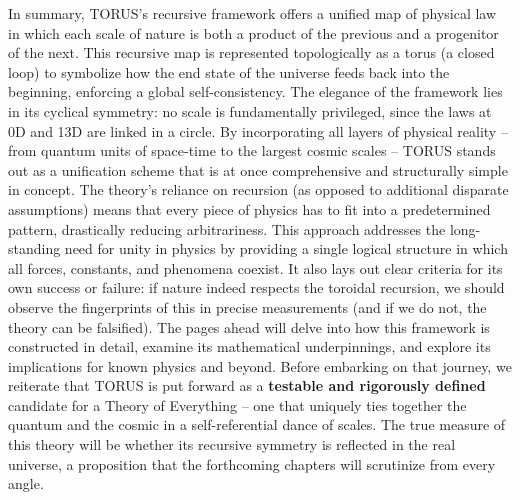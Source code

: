 \documentclass[]{article}
\begin{document}
In summary, TORUS's recursive framework offers a unified map of physical
law in which each scale of nature is both a product of the previous and
a progenitor of the next. This recursive map is represented
topologically as a torus (a closed loop) to symbolize how the end state
of the universe feeds back into the beginning, enforcing a global
self-consistency. The elegance of the framework lies in its cyclical
symmetry: no scale is fundamentally privileged, since the laws at 0D and
13D are linked in a circle. By incorporating all layers of physical
reality -- from quantum units of space-time to the largest cosmic scales
-- TORUS stands out as a unification scheme that is at once
comprehensive and structurally simple in concept. The theory's reliance
on recursion (as opposed to additional disparate assumptions) means that
every piece of physics has to fit into a predetermined pattern,
drastically reducing arbitrariness. This approach addresses the
long-standing need for unity in physics by providing a single logical
structure in which all forces, constants, and phenomena coexist. It also
lays out clear criteria for its own success or failure: if nature indeed
respects the toroidal recursion, we should observe the fingerprints of
this in precise measurements (and if we do not, the theory can be
falsified). The pages ahead will delve into how this framework is
constructed in detail, examine its mathematical underpinnings, and
explore its implications for known physics and beyond. Before embarking
on that journey, we reiterate that TORUS is put forward as a
\textbf{testable and rigorously defined} candidate for a Theory of
Everything -- one that uniquely ties together the quantum and the cosmic
in a self-referential dance of scales. The true measure of this theory
will be whether its recursive symmetry is reflected in the real
universe, a proposition that the forthcoming chapters will scrutinize
from every angle.
\end{document}
